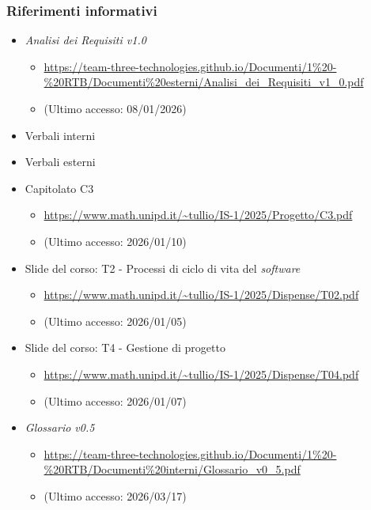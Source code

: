 \documentclass[a4paper,12pt]{article}
\begin{document}
        \subsubsection{Riferimenti informativi}
            \begin{itemize}
                \item \textit{Analisi dei Requisiti v1.0}
                \begin{itemize}
                    \item \url{https://team-three-technologies.github.io/Documenti/1%20-%20RTB/Documenti%20esterni/Analisi_dei_Requisiti_v1_0.pdf}
                    \item[] (Ultimo accesso: 08/01/2026)
                \end{itemize}
                \item Verbali interni
                \item Verbali esterni
                \item Capitolato C3
                \begin{itemize}
                    \item \url{https://www.math.unipd.it/~tullio/IS-1/2025/Progetto/C3.pdf}
                    \item[] (Ultimo accesso: 2026/01/10)
                \end{itemize}
                \item Slide del corso: T2 - Processi di ciclo di vita del \textit{software}
                \begin{itemize}
                    \item \url{https://www.math.unipd.it/~tullio/IS-1/2025/Dispense/T02.pdf}
                    \item[] (Ultimo accesso: 2026/01/05)
                \end{itemize}
                \item Slide del corso: T4 - Gestione di progetto
                \begin{itemize}
                    \item \url{https://www.math.unipd.it/~tullio/IS-1/2025/Dispense/T04.pdf}
                    \item[] (Ultimo accesso: 2026/01/07)
                \end{itemize}
                \item \textit{Glossario v0.5}
                \begin{itemize}
                    \item \url{https://team-three-technologies.github.io/Documenti/1%20-%20RTB/Documenti%20interni/Glossario_v0_5.pdf}
                    \item[] (Ultimo accesso: 2026/03/17)
                \end{itemize}
            \end{itemize}
\end{document}
